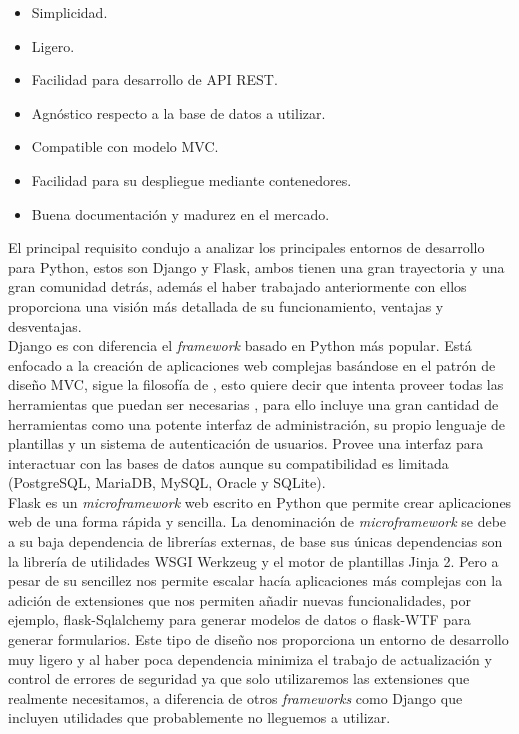 \documentclass[../proyecto.tex]{subfiles}
\begin{document}
\begin{itemize}
  \item Simplicidad.
  \item Ligero.
  \item Facilidad para desarrollo de API REST.
  \item Agnóstico respecto a la base de datos a utilizar.
  \item Compatible con modelo MVC.
  \item Facilidad para su despliegue mediante contenedores.
  \item Buena documentación y madurez en el mercado.
\end{itemize}

El principal requisito condujo a analizar los principales entornos de desarrollo para Python, estos son Django y Flask, ambos tienen una gran trayectoria y una gran comunidad detrás, además el haber trabajado anteriormente con ellos proporciona una visión más detallada de su funcionamiento, ventajas y desventajas.\\

Django es con diferencia el \textit{framework} basado en Python más popular. Está enfocado a la creación de aplicaciones web complejas basándose en el patrón de diseño MVC, sigue la filosofía de , esto quiere decir que intenta proveer todas las herramientas que puedan ser necesarias , para ello incluye una gran cantidad de herramientas como una potente interfaz de administración, su propio lenguaje de plantillas y un sistema de autenticación de usuarios. Provee una interfaz para interactuar con las bases de datos aunque su compatibilidad es limitada (PostgreSQL, MariaDB, MySQL, Oracle y SQLite).\\

Flask es un \textit{microframework} web escrito en Python que permite crear aplicaciones web de una forma rápida y sencilla. La denominación de \textit{microframework} se debe a su baja dependencia de librerías externas, de base sus únicas dependencias son la librería de utilidades WSGI Werkzeug y el motor de plantillas Jinja 2. Pero a pesar de su sencillez nos permite escalar hacía aplicaciones más complejas con la adición de extensiones que nos permiten añadir nuevas funcionalidades, por ejemplo, flask-Sqlalchemy para generar modelos de datos o flask-WTF para generar formularios. Este tipo de diseño nos proporciona un entorno de desarrollo muy ligero y al haber poca dependencia minimiza el trabajo de actualización y control de errores de seguridad ya que solo utilizaremos las extensiones que realmente necesitamos, a diferencia de otros \textit{frameworks} como Django que incluyen utilidades que probablemente no lleguemos a utilizar.\\
\end{document}
